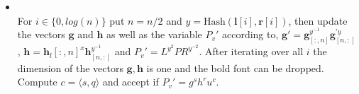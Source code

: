 \begin{algorithm}
\begin{itemize}
\begin{itemize}
\end{itemize}
\item{}\\
For $i\in\{0,log(n)\}$ put $n=n/2$ and $y=\text{Hash}(\bm{l}[i],\bm{r}[i])$, then update the vectors $\bm{g}$ and $\bm{h}$ as well as the  variable $P_v'$ according to, $\bm{g}'= \bm{g}_{[:,n]}^{y^{-1}} \bm{g}_{[n,:]}^{'y}$, $\bm{h}= \bm{h}_l{[:,n]}^{x}\bm{h}_{[n,:]}^{y^{-1}}$ and $ P_v' = L^{y^2}PR^{y^{-2}}  $. After iterating over all $i$ the dimension of the vectors $\bm{g},\bm{h}$ is one and the bold font can be dropped. Compute  $c=\langle s, q\rangle$ and  accept if $P_v' =g^sh^ru^c$.
\end{itemize}
\label{alg:inner_product}
\end{algorithm}

